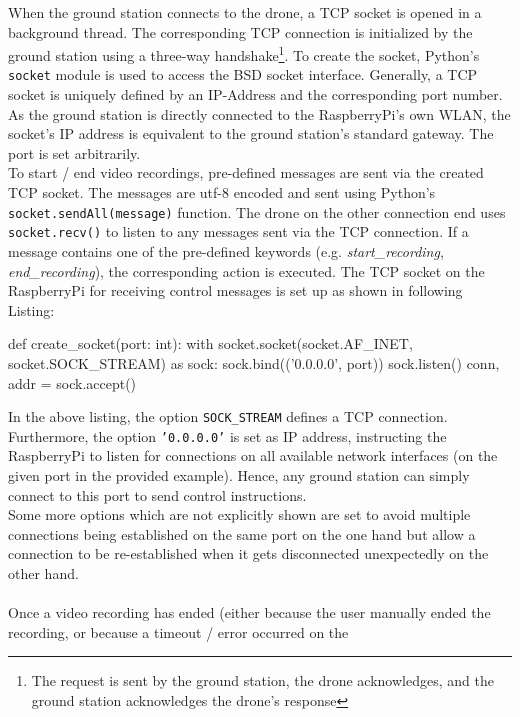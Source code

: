 \noindent When the ground station connects to the drone, a \ac{TCP} socket is
opened in a background thread.
The corresponding \ac{TCP} connection is initialized by the
ground station using a three-way handshake\footnote{The request is sent by the
ground station, the drone acknowledges, and the ground station acknowledges
the drone's response}.
To create the socket, Python's \texttt{socket} module is used to access the
BSD socket interface.
Generally, a \ac{TCP} socket is uniquely defined by an IP-Address and the
corresponding port number.
As the ground station is directly connected to the RaspberryPi's own WLAN, the
socket's IP address is equivalent to the ground station's standard gateway.
The port is set arbitrarily.\\
To start / end video recordings, pre-defined messages are sent via the created
\ac{TCP} socket.
The messages are utf-8 encoded and sent using Python's
\texttt{socket.sendAll(message)} function.
The drone on the other connection end uses \texttt{socket.recv()} to listen to
any messages sent via the \ac{TCP} connection.
If a message contains one of the pre-defined keywords (e.g.
\textit{start\_recording}, \textit{end\_recording}), the corresponding action
is executed.
The \ac{TCP} socket on the RaspberryPi for receiving control messages is set
up as shown in following Listing:
\begin{pythoncode}[caption=create TCP socket, label=alg:create_tcp_port]
    def create_socket(port: int):
        with socket.socket(socket.AF_INET, socket.SOCK_STREAM) as sock:
            sock.bind(('0.0.0.0', port))
            sock.listen()
            conn, addr = sock.accept()
\end{pythoncode}
In the above listing, the option \texttt{SOCK\_STREAM} defines a \ac{TCP}
connection.
Furthermore, the option \texttt{'0.0.0.0'} is set as IP address, instructing
the RaspberryPi  to listen for connections on all available network interfaces
(on the given port in the provided example).
Hence, any ground station can simply connect to this port to send
control instructions.\\
Some more options which are not explicitly shown are set to avoid multiple
connections being established on the same port on the one hand but allow a
connection to be re-established when it gets disconnected unexpectedly on the
other hand.\\\\
\noindent Once a video recording has ended (either because the user manually
ended the recording, or because a timeout / error occurred on the

